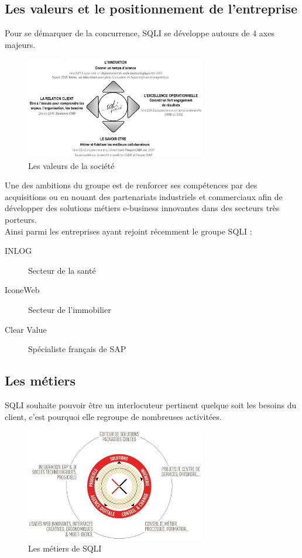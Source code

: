 \documentclass{report}
\newcommand{\jumpOne}{\\[1\baselineskip]}
\begin{document}
\subsection{Les valeurs et le positionnement de l'entreprise}
Pour se démarquer de la concurrence, SQLI se développe autours de 4 axes majeurs. 
\jumpOne

\begin{figure}[h!]
	\centering
	\includegraphics[width=0.7\textwidth]{assets/valeurs.png}
	\caption{Les valeurs de la société}
\end{figure}


Une des ambitions du groupe est de renforcer ses compétences par des acquisitions ou en nouant des partenariats industriels et commerciaux afin de développer des solutions métiers e-business innovantes dans des secteurs très porteurs. \\ 
Ainsi parmi les entreprises ayant rejoint récemment le groupe SQLI :

\begin{description}
	\item[INLOG]{Secteur de la santé} 
	\item[IconeWeb]{Secteur de l'immobilier} 
	\item[Clear Value]{Spécialiste français de SAP} 
\end{description}





\newpage





\subsection{Les métiers}
SQLI souhaite pouvoir être un interlocuteur pertinent quelque soit les besoins du client, c’est pourquoi elle regroupe de nombreuses activitées.

\begin{figure}[h!]
	\centering
	\includegraphics[width=0.7\textwidth]{assets/metiers.jpg}
	\caption{Les métiers de SQLI}
\end{figure}
\end{document}
